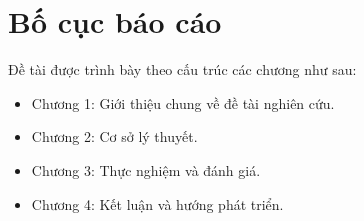 \documentclass[../BTL.tex]{subfiles}
\begin{document}
\section{ Bố cục báo cáo}
Đề tài được trình bày theo cấu trúc các chương như sau:

\begin{itemize}
    \item Chương 1: Giới thiệu chung về đề tài nghiên cứu.
    \item Chương 2: Cơ sở lý thuyết.
    \item Chương 3: Thực nghiệm và đánh giá.
    \item Chương 4: Kết luận và hướng phát triển.
\end{itemize}
\end{document}
